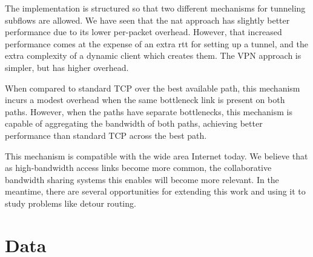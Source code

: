 \documentclass{cwru}
\begin{document}
The implementation is structured so that two different mechanisms for tunneling
subflows are allowed. We have seen that the \ac{nat} approach has slightly
better performance due to its lower per-packet overhead. However, that increased
performance comes at the expense of an extra \ac{rtt} for setting up a tunnel,
and the extra complexity of a dynamic client which creates them. The VPN
approach is simpler, but has higher overhead.

When compared to standard TCP over the best available path, this mechanism
incurs a modest overhead when the same bottleneck link is present on both paths.
However, when the paths have separate bottlenecks, this mechanism is capable of
aggregating the bandwidth of both paths, achieving better performance than
standard TCP across the best path.

This mechanism is compatible with the wide area Internet today. We believe that
as high-bandwidth access links become more common, the collaborative bandwidth
sharing systems this enables will become more relevant. In the meantime, there
are several opportunities for extending this work and using it to study problems
like detour routing.

\backmatter
\appendix

\chapter{Data}
\end{document}
